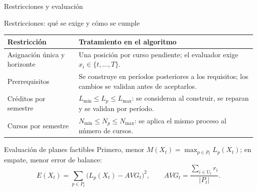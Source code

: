 \begin{frame}{Restricciones y evaluación}
  \small
  \begin{block}{Restricciones: qué se exige y cómo se cumple}
    \footnotesize
    \begin{tabular}{@{}p{}p{}@{}}
      \toprule
      \textbf{Restricción} & \textbf{Tratamiento en el algoritmo} \\
      \midrule
      Asignación única y horizonte & Una posición por curso pendiente;
        el evaluador exige $x_i\in\{t,\ldots,T\}$. \\
      Prerrequisitos & Se construye en períodos posteriores a los requisitos;
        los cambios se validan antes de aceptarlos. \\
      Créditos por semestre & $L_{\min}\leq L_p\leq L_{\max}$:
        se consideran al construir, se reparan y se validan por período. \\
      Cursos por semestre & $N_{\min}\leq N_p\leq N_{\max}$:
        se aplica el mismo proceso al número de cursos. \\
      \bottomrule
    \end{tabular}
  \end{block}

  \begin{exampleblock}{Evaluación de planes factibles}
    Primero, menor $M(X_t)=\max_{p\in P_t}L_p(X_t)$;
    en empate, menor error de balance:
    \[E(X_t)=\sum_{p\in P_t}\bigl(L_p(X_t)-AVG_t\bigr)^2,
      \qquad AVG_t=\frac{\sum_{i\in U_t}r_i}{|P_t|}.\]
  \end{exampleblock}
\end{frame}
